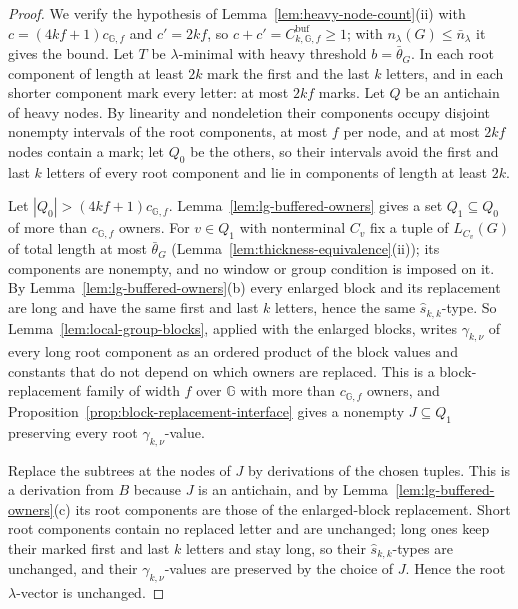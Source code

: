 \documentclass[11pt]{article}
\numberwithin{equation}{section}
\theoremstyle{plain}
\theoremstyle{definition}
\theoremstyle{remark}
\theoremstyle{plain}
\begin{document}
\begin{proof}
We verify the hypothesis of Lemma~\ref{lem:heavy-node-count}(ii) with
$c=(4kf+1)c_{{\mathbb G},f}$ and $c'=2kf$, so $c+c'=C^{\mathrm{buf}}_{k,{\mathbb G},f}\ge1$; with
$n_\lambda(G)\le\bar n_\lambda$ it gives the bound.  Let $T$ be $\lambda$-minimal with heavy
threshold $b=\bar\theta_G$.  In each root component of length at least $2k$ mark the first
and the last $k$ letters, and in each shorter component mark every letter: at
most $2kf$ marks.  Let $Q$ be an antichain of heavy nodes.  By linearity and
nondeletion their components occupy disjoint nonempty intervals of the root
components, at most $f$ per node, and at most $2kf$ nodes contain a mark; let
$Q_0$ be the others, so their intervals avoid the first and last $k$ letters of
every root component and lie in components of length at least $2k$.

Let $|Q_0|>(4kf+1)c_{{\mathbb G},f}$.  Lemma~\ref{lem:lg-buffered-owners} gives a set
$Q_1\subseteq Q_0$ of more than $c_{{\mathbb G},f}$ owners.  For $v\in Q_1$ with nonterminal
$C_v$ fix a tuple of $L_{C_v}(G)$ of total length at most $\bar\theta_G$
(Lemma~\ref{lem:thickness-equivalence}(ii)); its components are nonempty, and no
window or group condition is imposed on it.  By
Lemma~\ref{lem:lg-buffered-owners}(b) every enlarged block and its replacement
are long and have the same first and last $k$ letters, hence the same
$\widehat s_{k,k}$-type.  So Lemma~\ref{lem:local-group-blocks}, applied with the
enlarged blocks, writes $\gamma_{k,\nu}$ of every long root component as an
ordered product of the block values and constants that do not depend on which
owners are replaced.  This is a block-replacement family of width $f$ over ${\mathbb G}$
with more than $c_{{\mathbb G},f}$ owners, and
Proposition~\ref{prop:block-replacement-interface} gives a nonempty $J\subseteq Q_1$
preserving every root $\gamma_{k,\nu}$-value.

Replace the subtrees at the nodes of $J$ by derivations of the chosen tuples.
This is a derivation from $B$ because $J$ is an antichain, and by
Lemma~\ref{lem:lg-buffered-owners}(c) its root components are those of the
enlarged-block replacement.  Short root components contain no replaced letter
and are unchanged; long ones keep their marked first and last $k$ letters and
stay long, so their $\widehat s_{k,k}$-types are unchanged, and their
$\gamma_{k,\nu}$-values are preserved by the choice of $J$.  Hence the root
$\lambda$-vector is unchanged.
\end{proof}
\end{document}
